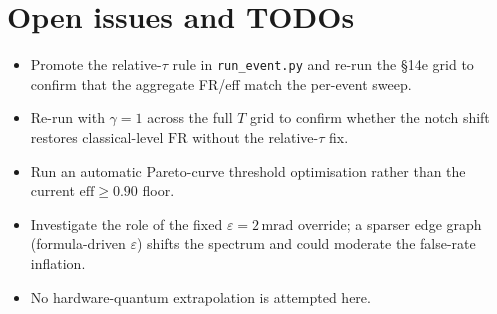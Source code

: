 \documentclass[11pt,a4paper]{article}
\newcommand{\eff}{\mathrm{eff}}
\newcommand{\FR}{\mathrm{FR}}
\begin{document}
\section{Open issues and TODOs}
\label{sec:todos}
\begin{itemize}
\item[--] Promote the relative-$\tau$ rule in \texttt{run\_event.py} and re-run the
§14e grid to confirm that the aggregate FR/eff match the per-event sweep.
\item[--] Re-run with $\gamma = 1$ across the full $T$ grid to confirm whether the
notch shift restores classical-level $\FR$ without the relative-$\tau$ fix.
\item[--] Run an automatic Pareto-curve threshold optimisation rather than the current
$\eff \ge 0.90$ floor.
\item[--] Investigate the role of the fixed $\varepsilon = 2\,\mathrm{mrad}$ override; a
sparser edge graph (formula-driven $\varepsilon$) shifts the spectrum and could moderate
the false-rate inflation.
\item[--] No hardware-quantum extrapolation is attempted here.
\end{itemize}



\end{document}

